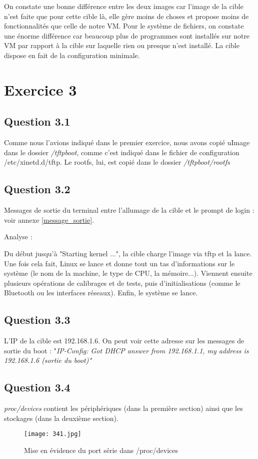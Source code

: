 \documentclass[a4paper,12pt]{report}
\begin{document}
On constate une bonne différence entre les deux images car l'image de la cible n'est faite que pour cette cible là, elle gère moins de choses et propose moins de fonctionnalités que celle de notre VM. Pour le système de fichiers, on constate une énorme différence car beaucoup plus de programmes sont installés sur notre VM par rapport à la cible sur laquelle rien ou presque n'est installé.
La cible dispose en fait de la configuration minimale.

\section{Exercice 3}
\subsection{Question 3.1}
Comme nous l'avions indiqué dans le premier exercice, nous avons copié uImage dans le dossier \textit{/tftpboot}, comme c'est indiqué dans le fichier de configuration /etc/xinetd.d/tftp. 
Le rootfs, lui, est copié dans le dossier \textit{/tftpboot/rootfs}

\subsection{Question 3.2}
Messages de sortie du terminal entre l'allumage de la cible et le prompt de login : voir annexe \ref{message_sortie}.

Analyse :\bigbreak

Du début jusqu'à "Starting kernel ...", la cible charge l'image via tftp et la lance. Une fois cela fait, Linux se lance et donne tout un tas d'informations sur le système (le nom de la machine, le type de CPU, la mémoire...). Viennent ensuite plusieurs opérations de calibrages et de tests, puis d'initialisations (comme le Bluetooth ou les interfaces réseaux). Enfin, le système se lance.


\subsection{Question 3.3}
L'IP de la cible est 192.168.1.6. On peut voir cette adresse sur les messages de sortie du boot : "\textit{IP-Config: Got DHCP answer from 192.168.1.1, my address is 192.168.1.6 (sortie du boot)"}

\subsection{Question 3.4}
\textit{proc/devices} contient les périphériques (dans la première section) ainsi que les stockages (dans la deuxième section).
\begin{figure}[!]
\centering
\texttt{[image: 341.jpg]}
\caption{Mise en évidence du port série dans /proc/devices}
\end{figure}
\end{document}
